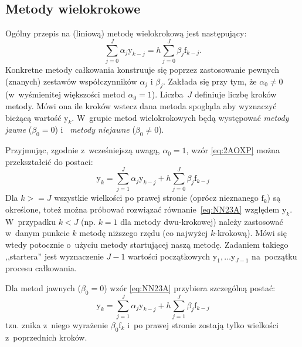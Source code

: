 \documentclass[paper=a4,DIV=12]{lpas}
\newcommand{\brm}[1]{\bm{\mathrm{#1}}}
\begin{document}
\begin{appendices}
\subsection{Metody wielokrokowe}
\label{sec:QS6QT}

Ogólny przepis na (liniową) metodę wielokrokową jest następujący:
\begin{equation}
  \sum_{j=0}^J \alpha_j \brm{y}_{k-j} = h \sum_{j=0}^J \beta_j \brm{f}_{k-j}.
  \label{eq:2AOXP}
\end{equation}
Konkretne metody całkowania konstruuje się poprzez zastosowanie pewnych
(znanych) zestawów współczynników $\alpha_j$ i $\beta_j$. Zakłada się przy tym,
że $\alpha_0 \neq 0$ (w~wyśmienitej większości metod $\alpha_0 = 1$).
Liczba~$J$ definiuje liczbę kroków metody. Mówi ona ile kroków wstecz dana
metoda spogląda aby wyznaczyć bieżącą wartość $\brm{y}_k$. W~grupie metod
wielokrokowych będą występować {\em metody jawne} ($\beta_0 = 0$) i~{\em
metody niejawne} ($\beta_0 \neq 0$).

Przyjmując, zgodnie z~wcześniejszą uwagą, $\alpha_0 = 1$, wzór \eqref{eq:2AOXP}
można przekształcić do postaci:
\begin{equation}
  \brm{y}_k = \sum_{j=1}^J \alpha_j \brm{y}_{k-j} + h \sum_{j=0}^J \beta_j \brm{f}_{k-j}
  \label{eq:NN23A}
\end{equation}
Dla $k>=J$ wszystkie wielkości po prawej stronie (oprócz nieznanego
$\brm{f}_k$) są określone, toteż można próbować rozwiązać
równanie~\eqref{eq:NN23A} względem $\brm{y}_k$. W~przypadku $k < J$ (np. $k=1$
dla metody dwu-krokowej) należy zastosować w~danym punkcie $k$ metodę niższego
rzędu (co najwyżej $k$-krokową). Mówi się wtedy potocznie o~użyciu metody
startującej naszą metodę. Zadaniem takiego ,,startera'' jest wyznaczenie $J-1$
wartości początkowych $\brm{y}_1, \dots \brm{y}_{J-1}$ na~początku procesu
całkowania.

Dla metod jawnych ($\beta_0 = 0$) wzór \eqref{eq:NN23A} przybiera szczególną
postać:
\begin{equation}
  \brm{y}_k = \sum_{j=1}^J \alpha_j \brm{y}_{k-j} + h \sum_{j=1}^J \beta_j \brm{f}_{k-j}
  \label{eq:EQ0F7}
\end{equation}
tzn. znika z~niego wyrażenie $\beta_0 \brm{f}_k$ i~po prawej stronie zostają
tylko wielkości z~poprzednich kroków.


\end{appendices}
\end{document}
